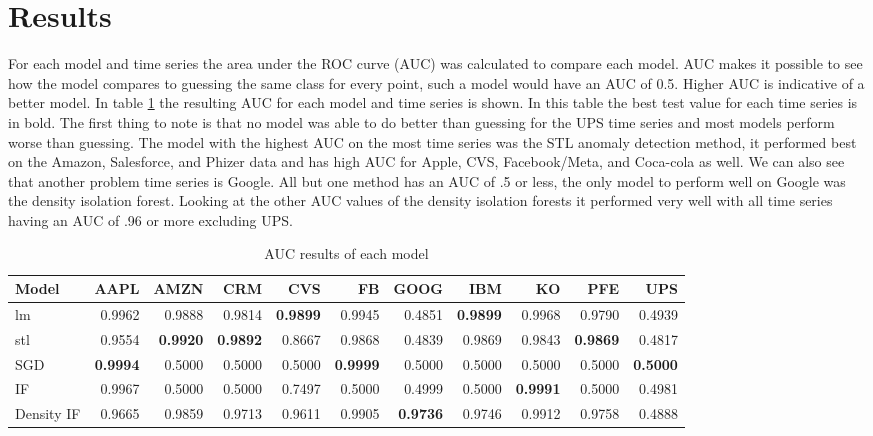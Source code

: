 \documentclass{article}
\begin{document}
\section{Results}

For each model and time series the area under the ROC curve (AUC) was calculated to compare each model. AUC makes it possible to see how the model compares to guessing the same class for every point, such a model would have an AUC of 0.5. Higher AUC is indicative of a better model. In table \ref{tab:auc} the resulting AUC for each model and time series is shown. In this table the best test value for each time series is in bold. The first thing to note is that no model was able to do better than guessing for the UPS time series and most models perform worse than guessing. The model with the highest AUC on the most time series was the STL anomaly detection method, it performed best on the Amazon, Salesforce, and Phizer data and has high AUC for Apple, CVS, Facebook/Meta, and Coca-cola as well. We can also see that another problem time series is Google. All but one method has an AUC of .5 or less, the only model to perform well on Google was the density isolation forest. Looking at the other AUC values of the density isolation forests it performed very well with all time series having an AUC of .96 or more excluding UPS.

\begin{table}[ht]
    \centering
    \caption{AUC results of each model}
    \label{tab:auc}
    \small
    \begin{tabular}{l|r|r|r|r|r|r|r|r|r|r}
        \hline
        Model & AAPL & AMZN & CRM & CVS & FB & GOOG & IBM & KO & PFE & UPS\\
        \hline
        lm & 0.9962 & 0.9888 & 0.9814 & \textbf{0.9899} & 0.9945 & 0.4851 & \textbf{0.9899} & 0.9968 & 0.9790 & 0.4939\\
        \hline
        stl & 0.9554 & \textbf{0.9920} & \textbf{0.9892} & 0.8667 & 0.9868 & 0.4839 & 0.9869 & 0.9843 & \textbf{0.9869} & 0.4817\\
        \hline
        SGD & \textbf{0.9994} & 0.5000 & 0.5000 & 0.5000 & \textbf{0.9999} & 0.5000 & 0.5000 & 0.5000 & 0.5000 & \textbf{0.5000}\\
        \hline
        IF & 0.9967 & 0.5000 & 0.5000 & 0.7497 & 0.5000 & 0.4999 & 0.5000 & \textbf{0.9991} & 0.5000 & 0.4981\\
        \hline
        Density IF & 0.9665 & 0.9859 & 0.9713 & 0.9611 & 0.9905 & \textbf{0.9736} & 0.9746 & 0.9912 & 0.9758 & 0.4888\\
        \hline
    \end{tabular}
\end{table}
\end{document}
